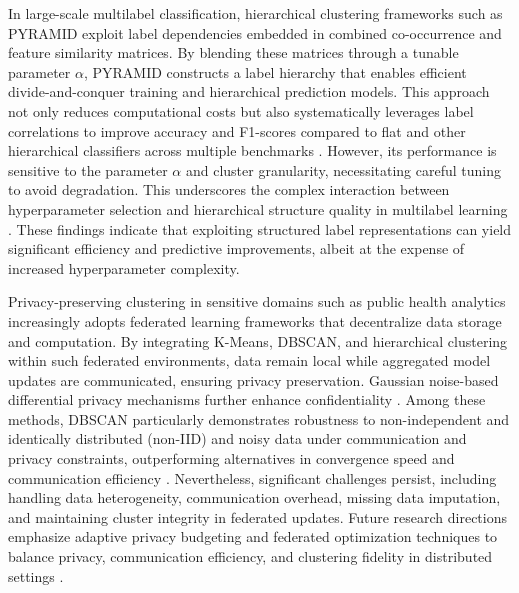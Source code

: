 \documentclass[sigconf]{acmart}
\begin{document}
In large-scale multilabel classification, hierarchical clustering frameworks such as PYRAMID exploit label dependencies embedded in combined co-occurrence and feature similarity matrices. By blending these matrices through a tunable parameter \(\alpha\), PYRAMID constructs a label hierarchy that enables efficient divide-and-conquer training and hierarchical prediction models. This approach not only reduces computational costs but also systematically leverages label correlations to improve accuracy and F1-scores compared to flat and other hierarchical classifiers across multiple benchmarks \cite{ref17}. However, its performance is sensitive to the parameter \(\alpha\) and cluster granularity, necessitating careful tuning to avoid degradation. This underscores the complex interaction between hyperparameter selection and hierarchical structure quality in multilabel learning \cite{ref17}. These findings indicate that exploiting structured label representations can yield significant efficiency and predictive improvements, albeit at the expense of increased hyperparameter complexity.

Privacy-preserving clustering in sensitive domains such as public health analytics increasingly adopts federated learning frameworks that decentralize data storage and computation. By integrating K-Means, DBSCAN, and hierarchical clustering within such federated environments, data remain local while aggregated model updates are communicated, ensuring privacy preservation. Gaussian noise-based differential privacy mechanisms further enhance confidentiality \cite{ref22}. Among these methods, DBSCAN particularly demonstrates robustness to non-independent and identically distributed (non-IID) and noisy data under communication and privacy constraints, outperforming alternatives in convergence speed and communication efficiency \cite{ref22}. Nevertheless, significant challenges persist, including handling data heterogeneity, communication overhead, missing data imputation, and maintaining cluster integrity in federated updates. Future research directions emphasize adaptive privacy budgeting and federated optimization techniques to balance privacy, communication efficiency, and clustering fidelity in distributed settings \cite{ref22}.
\end{document}
